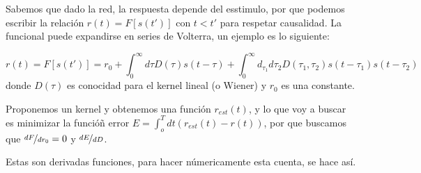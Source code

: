 Sabemos que dado la red, la respuesta depende del esstimulo, por que podemos escribir la relación $r(t) =  F[s(t')]$ con $t<t'$ para respetar causalidad. La funcional puede expandirse en series de Volterra, un ejemplo es lo siguiente:

\begin{equation}
	r(t) = F[s(t')]= r_0 + \int_0^\infty d\tau D(\tau) s(t-\tau) + \int_0^\infty d_{\tau_1} d \tau_2 D(\tau_1, \tau_2) s(t-\tau_1) s(t-\tau_2)
\end{equation}
donde $D(\tau)$ es conocidad para el kernel lineal (o Wiener) y $r_0$ es una constante.

Proponemos un kernel y obtenemos una función $r_{est}(t)$, y lo que voy a buscar es minimizar la funcióñ error $E = \int_o^T dt (r_{est}(t)-r(t))$, por que buscamos que $\nicefrac{dF}{dr_0}=0$ y $\nicefrac{dE}{dD}$.

Estas son derivadas funciones, para hacer númericamente esta cuenta, se hace así.

